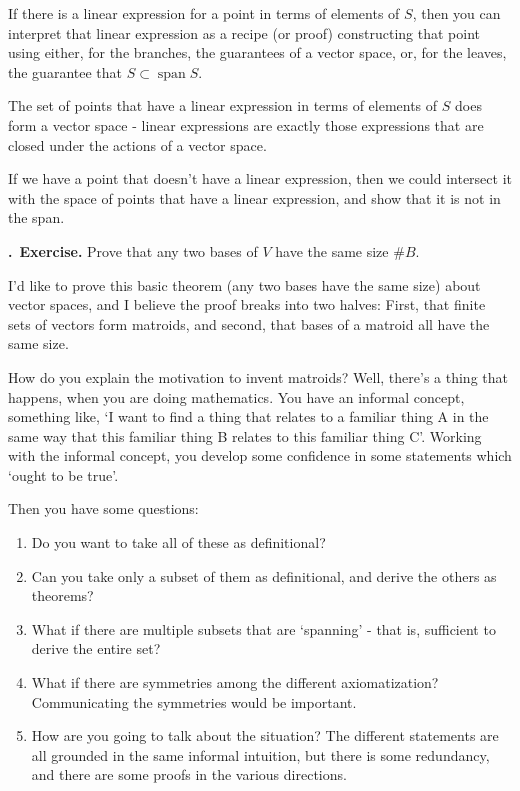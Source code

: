 \documentclass[11pt, noamsfonts]{amsart}
\newcommand{\pointheader}{\vspace{2mm}\noindent\refstepcounter{section}\textbf{\thesection.}}
\newcommand{\bpoint}[1]{\pointheader~{\bf #1.}}
\begin{document}
If there is a linear expression for a point in terms of elements of \(S\), then you can interpret that linear expression as a recipe (or proof) constructing that point using either, for the branches, the guarantees of a vector space, or, for the leaves, the guarantee that \(S \subset \operatorname{span} S\).

The set of points that have a linear expression in terms of elements of \(S\) does form a vector space - linear expressions are exactly those expressions that are closed under the actions of a vector space.

If we have a point that doesn't have a linear expression, then we could intersect it with the space of points that have a linear expression, and show that it is not in the span.

\bpoint{Exercise}
Prove that any two bases of \(V\) have the same size \(\#B\).

I'd like to prove this basic theorem (any two bases have the same size) about vector spaces, and I believe the proof breaks into two halves: First, that finite sets of vectors form matroids, and second, that bases of a matroid all have the same size.

How do you explain the motivation to invent matroids?
Well, there's a thing that happens, when you are doing mathematics.
You have an informal concept, something like,
`I want to find a thing that relates to a familiar thing A in the same way that this familiar thing B relates to this familiar thing C'.
Working with the informal concept, you develop some confidence in some statements which `ought to be true'.

Then you have some questions:
\begin{enumerate}
    \item Do you want to take all of these as definitional?
    \item Can you take only a subset of them as definitional, and derive the others as theorems?
    \item What if there are multiple subsets that are `spanning' - that is, sufficient to derive the entire set?
    \item What if there are symmetries among the different axiomatization? Communicating the symmetries would be important.
    \item How are you going to talk about the situation? The different statements are all grounded in the same informal intuition, but there is some redundancy, and there are some proofs in the various directions.
\end{enumerate}
\end{document}
